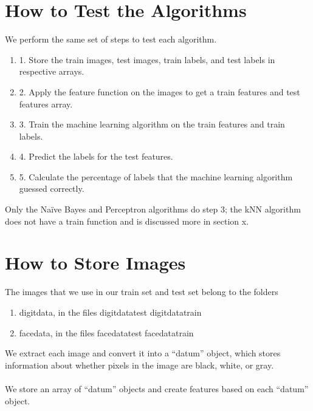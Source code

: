 \documentclass{article}
\begin{document}
\section{How to Test the Algorithms}

We perform the same set of steps to test each algorithm. 

\begin{enumerate}

	\item 1. Store the train images, test images, train labels, and test labels in respective arrays. 
	\item 2. Apply the feature function on the images to get a train features and test features array. 
	\item 3. Train the machine learning algorithm on the train features and train labels. 
	\item 4. Predict the labels for the test features. 
	\item 5. Calculate the percentage of labels that the machine learning algorithm guessed correctly. 
\end{enumerate}

Only the Naïve Bayes and Perceptron algorithms do step 3; the kNN algorithm does not have a train function and is discussed more in section x. 


\section{How to Store Images}

The images that we use in our train set and test set belong to the folders 

\begin{enumerate}
	\item digitdata, in the files
		\subitem digitdatatest
		\subitem digitdatatrain
	\item facedata, in the files
		\subitem facedatatest
		\subitem facedatatrain
\end{enumerate}

We extract each image and convert it into a “datum” object, which stores information about whether pixels in the image are black, white, or gray. \\\\
We store an array of “datum” objects and create features based on each “datum” object.
\end{document}
